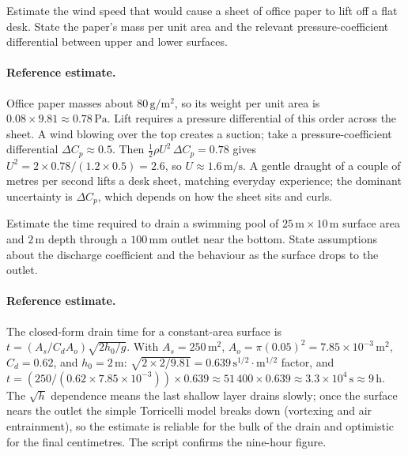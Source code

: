 \begin{exercise}
Estimate the wind speed that would cause a sheet of office paper
to lift off a flat desk. State the paper's mass per unit area and
the relevant pressure-coefficient differential between upper and
lower surfaces.

\paragraph{Reference estimate.} Office paper masses about
$80\,\si{\gram\per\meter\squared}$, so its weight per unit area is
$0.08\times 9.81 \approx 0.78\,\si{\pascal}$. Lift requires a
pressure differential of this order across the sheet. A wind blowing
over the top creates a suction; take a pressure-coefficient
differential $\Delta C_p \approx 0.5$. Then $\tfrac12\rho U^2\,\Delta
C_p = 0.78$ gives $U^2 = 2\times 0.78/(1.2\times 0.5) = 2.6$, so $U
\approx 1.6\,\si{\meter\per\second}$. A gentle draught of a couple of
metres per second lifts a desk sheet, matching everyday experience;
the dominant uncertainty is $\Delta C_p$, which depends on how the
sheet sits and curls.
\end{exercise}

\begin{exercise}
Estimate the time required to drain a swimming pool of $25\,\si{
\meter} \times 10\,\si{\meter}$ surface area and $2\,\si{\meter}$
depth through a $100\,\si{\milli\meter}$ outlet near the bottom.
State assumptions about the discharge coefficient and the
behaviour as the surface drops to the outlet.

\paragraph{Reference estimate.} The closed-form drain time for a
constant-area surface is $t = (A_s/C_d A_o)\sqrt{2h_0/g}$. With $A_s =
250\,\si{\meter}^2$, $A_o = \pi(0.05)^2 = 7.85\times
10^{-3}\,\si{\meter}^2$, $C_d = 0.62$, and $h_0 = 2\,\si{\meter}$:
$\sqrt{2\times 2/9.81} = 0.639\,\si{\second}^{1/2}\cdot\si{\meter}^{1/2}$
factor, and $t = (250/(0.62\times 7.85\times 10^{-3}))\times 0.639
\approx 51\,400\times 0.639 \approx 3.3\times 10^4\,\si{\second}
\approx 9\,\text{h}$. The $\sqrt{h}$ dependence means the last shallow
layer drains slowly; once the surface nears the outlet the simple
Torricelli model breaks down (vortexing and air entrainment), so the
estimate is reliable for the bulk of the drain and optimistic for the
final centimetres. The script  confirms the
nine-hour figure.
\end{exercise}

